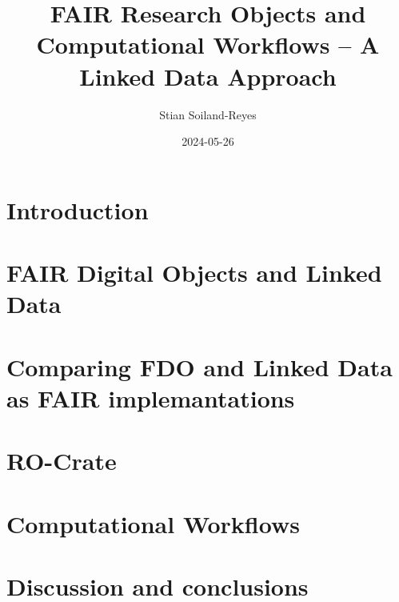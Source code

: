 \documentclass[british,a4paper]{book}
\title{FAIR Research Objects and Computational Workflows – A Linked Data Approach}
\author{Stian Soiland-Reyes}
\date{2024-05-26}
\begin{document}
\frontmatter
\maketitle



\printglossaries



\mainmatter
\fancyhead[LO]{\leftmark}

\chapter{Introduction}
\label{chapter:introduction}






\chapter{FAIR Digital Objects and Linked Data}
\label{chapter:background}


\chapter{Comparing FDO and Linked Data as FAIR implemantations}
\label{chapter:fdo}




\chapter{RO-Crate}
\label{chapter:ro-crate}





\chapter{Computational Workflows}
\label{chapter:workflows}







\chapter{Discussion and conclusions}
\label{chapter:conclusions}



\appendix
{}
\end{document}
